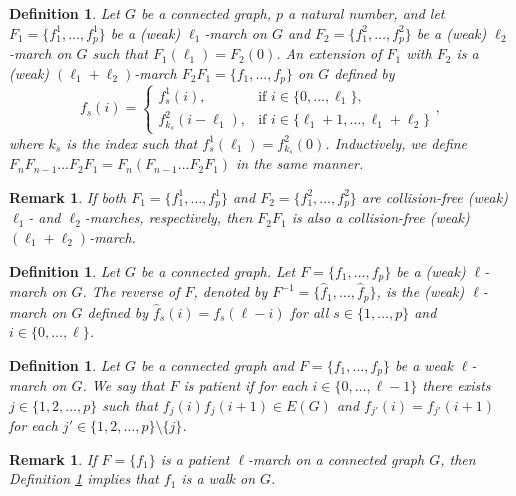 \documentclass{article}
\newtheorem{definition}[theorem]{Definition}
\newtheorem{remark}[theorem]{Remark}
\begin{document}
\begin{definition}\label{def:extension}
Let $G$ be a connected graph, $p$ a natural number, and let $F_1=\{f^1_1,\ldots,f^1_p\}$ be a (weak) $\ell_1$-march  on $G$ and $F_2=\{f^2_1,\ldots,f^2_p\}$ be a (weak) $\ell_2$-march on $G$ such that $F_1(\ell_1)=F_2(0)$. An \emph{extension of $F_1$ with $F_2$} is a (weak) $(\ell_1+\ell_2)$-march $F_2F_1=\{f_1,\ldots,f_p\}$ on $G$ defined by 
\[
f_s(i) = \begin{cases}
            f^1_s(i), & \text{if } i\in \{0,\ldots,\ell_1\},\\
            f^2_{k_s}(i-\ell_1), & \text{if } i\in \{\ell_1+1,\ldots,\ell_1+\ell_2\}
         \end{cases},
\]
where $k_s$ is the index such that  $f^1_s(\ell_1)=f^2_{k_s}(0)$. Inductively, we define $F_n F_{n-1} \ldots F_2 F_1=F_n(F_{n-1} \ldots F_2 F_1)$ in the same manner.
\end{definition}

\begin{remark}\label{rem:extension-cf}
	If both $F_1=\{f^1_1,\ldots,f^1_p\}$ and $F_2=\{f^2_1,\ldots,f^2_p\}$ are collision-free (weak) $\ell_1$- and $\ell_2$-marches, respectively, then $F_2F_1$ is also a collision-free (weak) $(\ell_1+\ell_2)$-march.
\end{remark}

\begin{definition}\label{def:reverse-march}
	Let $G$ be a connected graph. Let $F=\{f_1,\ldots,f_p\}$ be a (weak) $\ell$-march on $G$. The \emph{reverse of $F$}, denoted by $F^{-1}=\{\widehat{f}_1,\ldots,\widehat{f}_p\}$, 
	is the (weak) $\ell$-march on $G$ defined by $\widehat{f}_s(i)=f_s(\ell-i)$ for all $s\in \{1,\ldots,p\}$ and $i\in\{0,\ldots,\ell\}$.
\end{definition}

\begin{definition}\label{def:patient-march}
Let $G$ be a connected graph and $F=\{f_1,\ldots,f_p\}$ be a weak $\ell$-march on $G$. We say that $F$ is \emph{patient} if for each $i\in\{0,\ldots,\ell-1\}$ there exists $j\in\{1, 2, \ldots, p\}$ such that $f_j(i)f_j(i+1)\in E(G)$ and $f_{j'}(i)=f_{j'}(i+1)$ for each $j'\in\{1, 2, \ldots, p\}\setminus\{j\}$.
\end{definition}

\begin{remark}
If $F=\{f_1\}$ is a patient $\ell$-march on a connected graph $G$, then Definition \ref{def:patient-march} implies that $f_1$ is a walk on $G$.
\end{remark}
\end{document}
